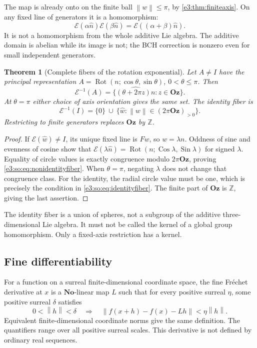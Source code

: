 \documentclass[11pt,letterpaper]{article}
\numberwithin{equation}{section}
\newtheorem{theorem}{Theorem}[section]
\theoremstyle{definition}
\theoremstyle{remark}
\newcommand{\No}{\mathbf{No}}
\newcommand{\Z}{\mathbb Z}
\newcommand{\Oz}{\mathbf{Oz}}
\newcommand{\Sin}{\operatorname{Sin}}
\newcommand{\Cos}{\operatorname{Cos}}
\newcommand{\Rot}{\operatorname{Rot}}
\newcommand{\norm}[1]{\left\lVert#1\right\rVert}
\begin{document}
The map is already onto on the finite ball \(\norm w\le\pi\), by
\cref{e3:thm:finiteaxis}. On any fixed line of generators it is a homomorphism:
\[
 \mathcal E(\alpha\widehat n)\mathcal E(\beta\widehat n)=\mathcal E((\alpha+\beta)\widehat n).
\]
It is not a homomorphism from the whole additive Lie algebra. The additive
domain is abelian while its image is not; the BCH correction is nonzero even
for small independent generators.

\begin{theorem}[Complete fibers of the rotation exponential]\label{e3:so:thm:expfibers}
Let \(A\ne I\) have the principal representation
\(A=\Rot(n;\cos\theta,\sin\theta)\), \(0<\theta\le\pi\). Then
\begin{equation}\label{e3:so:eq:nonidentityfiber}
 \mathcal E^{-1}(A)=\{\widehat{(\theta+2\pi z)n}:z\in\Oz\}.
\end{equation}
At \(\theta=\pi\) either choice of axis orientation gives the same set.
The identity fiber is
\begin{equation}\label{e3:so:eq:identityfiber}
 \mathcal E^{-1}(I)=\{0\}\ \cup\
 \{\widehat w:\norm w\in(2\pi\Oz)_{>0}\}.
\end{equation}
Restricting to finite generators replaces \(\Oz\) by \(\Z\).
\end{theorem}
\begin{proof}
If \(\mathcal E(\widehat w)\ne I\), its unique fixed line is \(Fw\), so
\(w=\lambda n\). Oddness of sine and evenness of cosine show that
\(\mathcal E(\lambda\widehat n)=\Rot(n;\Cos\lambda,\Sin\lambda)\) for signed \(\lambda\).
Equality of circle values is exactly congruence modulo \(2\pi\Oz\), proving
\cref{e3:so:eq:nonidentityfiber}. When \(\theta=\pi\), negating \(\lambda\) does not
change that congruence class. For the identity, the radial circle value must be
one, which is precisely the condition in \cref{e3:so:eq:identityfiber}.
The finite part of \(\Oz\) is \(\Z\), giving the last assertion.
\end{proof}

The identity fiber is a union of spheres, not a subgroup of the additive
three-dimensional Lie algebra. It must not be called the kernel of a global
group homomorphism. Only a fixed-axis restriction has a kernel.

\subsection{Fine differentiability}

For a function on a surreal finite-dimensional coordinate space, the fine
Fr\'echet derivative at \(x\) is a \(\No\)-linear map \(L\) such that for every
positive surreal \(\eta\), some positive surreal \(\delta\) satisfies
\[
 0<\norm h<\delta\quad\Longrightarrow\quad
 \norm{f(x+h)-f(x)-Lh}<\eta\norm h.
\]
Equivalent finite-dimensional coordinate norms give the same definition.
The quantifiers range over all positive surreal scales. This derivative is not
defined by ordinary real sequences.
\end{document}
